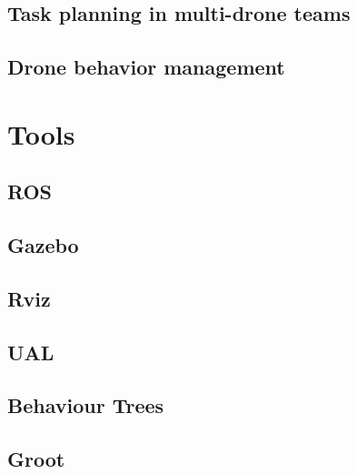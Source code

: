 \subsection{Task planning in multi-drone teams}
\label{subsec:TaskPlanning}

\subsection{Drone behavior management}
\label{subsec:DroneBehaviorManagement}


\section{Tools}
\label{sec:PreviousStudy}

\subsection{ROS}
\label{subsec:ROS}

\subsection{Gazebo}
\label{subsec:Gazebo}

\subsection{Rviz}
\label{subsec:Rviz}

\subsection{UAL}
\label{subsec:UAL}

\subsection{Behaviour Trees}
\label{subsec:BehaviourTrees}

\subsection{Groot}
\label{subsec:Groot}



\endinput
